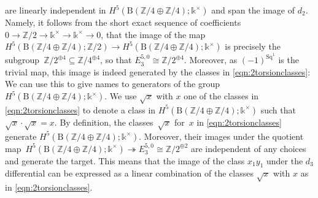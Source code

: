 \documentclass[10pt,a4paper]{amsart}
\numberwithin{equation}{section}
\begin{document}
 are linearly independent in $H^5(\mathrm{B}(\mathbb{Z}/4\oplus\mathbb{Z}/4);\mathds{k}^{\times})$ and span the image of $d_2$. Namely, it follows from the short exact sequence of coefficients $0\rightarrow\mathbb{Z}/2\rightarrow\mathds{k}^{\times}\rightarrow\mathds{k}^{\times}\rightarrow 0$, that the image of the map $H^5(\mathrm{B}(\mathbb{Z}/4\oplus\mathbb{Z}/4);\mathbb{Z}/2)\rightarrow H^5(\mathrm{B}(\mathbb{Z}/4\oplus\mathbb{Z}/4);\mathds{k}^{\times})$ is precisely the subgroup~${\mathbb{Z}/2^{\oplus 4}\subseteq \mathbb{Z}/4^{\oplus 4}}$, so that $E_3^{5,0}\cong \mathbb{Z}/2^{\oplus 4}$. Moreover, as $(-1)^{\mathrm{Sq}^1}$ is the trivial map, this image is indeed generated by the classes in \eqref{eqn:2torsionclasses}: We can use this to give names to generators of the group ${H^5(\mathrm{B}(\mathbb{Z}/4\oplus\mathbb{Z}/4);\mathds{k}^{\times})}$. We use $\sqrt{x}$ with $x$ one of the classes in \eqref{eqn:2torsionclasses} to denote a class in $H^5(\mathrm{B}(\mathbb{Z}/4\oplus\mathbb{Z}/4);\mathds{k}^{\times})$ such that $\sqrt{x}\cdot \sqrt{x} = x$. By definition, the classes~$\sqrt{x}$ for~$x$ in \eqref{eqn:2torsionclasses} generate $H^5(\mathrm{B}(\mathbb{Z}/4\oplus\mathbb{Z}/4);\mathds{k}^{\times})$. Moreover, their images under the quotient map~${H^5(\mathrm{B}(\mathbb{Z}/4\oplus\mathbb{Z}/4);\mathds{k}^{\times})\twoheadrightarrow E_3^{5,0}\cong\mathbb{Z}/2^{\oplus 2}}$ are independent of any choices and generate the target. This means that the image of the class $x_1y_1$ under the $d_3$ differential  can be expressed as a linear combination of the classes $\sqrt{x}$ with $x$ as in \eqref{eqn:2torsionclasses}.
\end{document}
